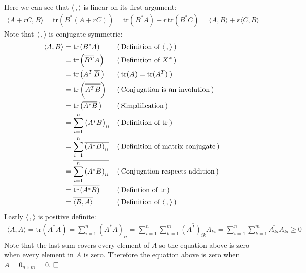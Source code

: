 \documentclass[fleqn]{article}
\newcommand{\evidence}[1]{\ensuremath{(\hspace{0.2em} \text{#1} \hspace{0.2em})}}
\newcommand{\qed}{\hfill\ensuremath{\square}}
\begin{document}
Here we can see that $\langle \, , \rangle$ is linear on its first argument:
\begin{align*}
  \langle A + rC, B \rangle
  = \text{tr}(B^*(A + rC))
  = \text{tr}(B^*A) + r \, \text{tr}(B^*C)
  =  \langle A, B \rangle + r \langle C, B \rangle
\end{align*}
Note that $\langle \, , \rangle$ is conjugate symmetric:
\begin{align*}
  \langle A, B \rangle
  &= \text{tr}\left ( B^*A \right )
  && \evidence{Definition of $\langle \, , \rangle$} \\
  &= \text{tr}\left ( \overline{B^T}A \right )
  && \evidence{Definition of $X^*$} \\
  &= \text{tr}\left ( A^T \, \overline{B} \, \right )
  && \evidence{$\text{tr}(A) = \text{tr}(A^T)$} \\
  &= \text{tr}\left ( \overline{\overline{A^T\overline{B}}} \right )
  && \evidence{Conjugation is an involution} \\
  &= \text{tr}\left ( \overline{A^*B} \, \right )
  && \evidence{Simplification} \\
  &= \sum_{i=1}^n {\left ( \overline{A^*B} \right )}_{ii}
  && \evidence{Definition of tr} \\
  &= \sum_{i=1}^n \overline{\left ( A^*B \right )_{ii}}
  && \evidence{Definition of matrix conjugate} \\
  &= \overline{\sum_{i=1}^n \left ( A^*B \right )_{ii}}
  && \evidence{Conjugation respects addition} \\
  &= \overline{\text{tr}\left ( A^*B \right )}
  && \evidence{Defintion of tr} \\
  &= \overline{\langle B, A \rangle}
  && \evidence{Definition of $\langle \, , \rangle$}
\end{align*}
Lastly $\langle \, , \rangle$ is positive definite:
\begin{align*}
  \langle A, A \rangle
  = \text{tr}(A^*A)
  = \sum_{i=1}^n (A^*A)_{ii}
  = \sum_{i=1}^n\sum_{k=1}^m \overline{(A^T)_{ik}} A_{ki}
  = \sum_{i=1}^n\sum_{k=1}^m \overline{A_{ki}} A_{ki}
  \geq 0
\end{align*}
Note that the last sum covers every element of $A$ so the equation above is zero
when every element in $A$ is zero. Therefore the equation above is zero when
$A = 0_{n\times m} = 0$. $\qed$
\end{document}

